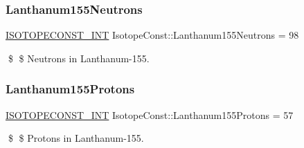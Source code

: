 \subsubsection{\texorpdfstring{Lanthanum155\+Neutrons}{Lanthanum155Neutrons}}
{\footnotesize\ttfamily \mbox{\hyperlink{group___isotope_const-_macros_ga5f18360b3e99483a35c32d789e62621c}{I\+S\+O\+T\+O\+P\+E\+C\+O\+N\+S\+T\+\_\+\+I\+NT}} Isotope\+Const\+::\+Lanthanum155\+Neutrons = 98}

\$ \$ Neutrons in Lanthanum-\/155. \mbox{\label{group___isotope_const-_lanthanum-_la155_ga6965da4555edaabea3356dcca17632ec}} 
\subsubsection{\texorpdfstring{Lanthanum155\+Protons}{Lanthanum155Protons}}
{\footnotesize\ttfamily \mbox{\hyperlink{group___isotope_const-_macros_ga5f18360b3e99483a35c32d789e62621c}{I\+S\+O\+T\+O\+P\+E\+C\+O\+N\+S\+T\+\_\+\+I\+NT}} Isotope\+Const\+::\+Lanthanum155\+Protons = 57}

\$ \$ Protons in Lanthanum-\/155. 